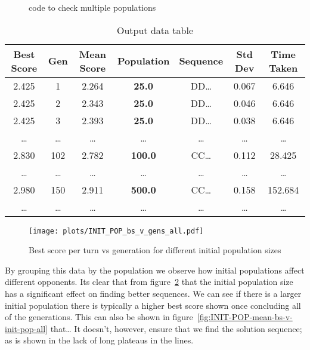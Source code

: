 \begin{figure}
    \inputminted{python}{code_snippets/populationChecker.py}
    \caption{code to check multiple populations}\label{code:populationChecker}
\end{figure}

\begin{table*}
    \centering
    \begin{tabular}{ccccccc}
        \toprule
        Best Score & Gen & Mean Score & Population & Sequence & Std Dev & Time Taken \\
        \midrule
        2.425 & 1 & 2.264 & \textbf{25.0} & DD\ldots & 0.067 & 6.646\\
        2.425 & 2 & 2.343 & \textbf{25.0} & DD\ldots & 0.046 & 6.646\\
        2.425 & 3 & 2.393 & \textbf{25.0} & DD\ldots & 0.038 & 6.646\\
        \ldots  & \ldots  & \ldots  & \ldots  & \ldots  & \ldots  & \ldots \\
        2.830 & 102 & 2.782 & \textbf{100.0} & CC\ldots & 0.112 & 28.425\\
        \ldots  & \ldots  & \ldots  & \ldots  & \ldots  & \ldots  & \ldots \\
        2.980 & 150 & 2.911 & \textbf{500.0} & CC\ldots & 0.158 & 152.684\\
        \ldots  & \ldots  & \ldots  & \ldots  & \ldots  & \ldots  & \ldots \\
        \bottomrule
    \end{tabular}
    \caption{Output data table}\label{table:popCheckerDataTable}
\end{table*}

\begin{figure}[h]
    \texttt{[image: plots/INIT\_POP\_bs\_v\_gens\_all.pdf]}
    \caption{Best score per turn vs generation for different initial population sizes}\label{fig:INIT-POP-bs-v-gens-all}
\end{figure}

By grouping this data by the population we observe how initial populations affect different opponents.
Its clear that from figure~\ref{fig:INIT-POP-bs-v-gens-all} that the initial population size has a significant effect on finding better sequences.
We can see if there is a larger initial population there is typically a higher best score shown once concluding all of the generations.
This can also be shown in figure~\ref{fig:INIT-POP-mean-bs-v-init-pop-all} that\ldots
It doesn't, however, ensure that we find the solution sequence;
as is shown in the lack of long plateaus in the lines.\\

